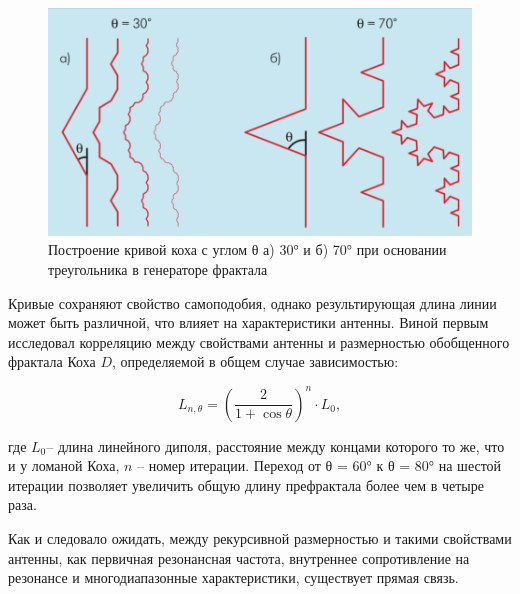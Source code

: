 \begin{figure}[H]
    \centering
    \includegraphics[width=.9\textwidth]{img/koch2.png}
    \caption{Построение кривой коха с углом θ а) 30° и б) 70° при основании треугольника в генераторе фрактала}
    \label{fig:koch2}
\end{figure}


Кривые сохраняют свойство самоподобия, однако результирующая длина линии может быть различной, что влияет на характеристики антенны. Виной первым исследовал корреляцию между свойствами антенны и размерностью обобщенного фрактала Коха $D$, определяемой в общем случае зависимостью:

\[
L_{n,\theta} = \left( \frac{2}{1+\cos \theta}\right)^n \cdot L_0,
\]

где $L_0$– длина линейного диполя, расстояние между концами которого то же, что и у ломаной Коха, $n$ – номер итерации. Переход от θ = 60° к θ = 80° на шестой итерации позволяет увеличить общую длину префрактала более чем в четыре раза.


Как и следовало ожидать, между рекурсивной размерностью и такими свойствами антенны, как первичная резонансная частота, внутреннее сопротивление на резонансе и многодиапазонные характеристики, существует прямая связь.

